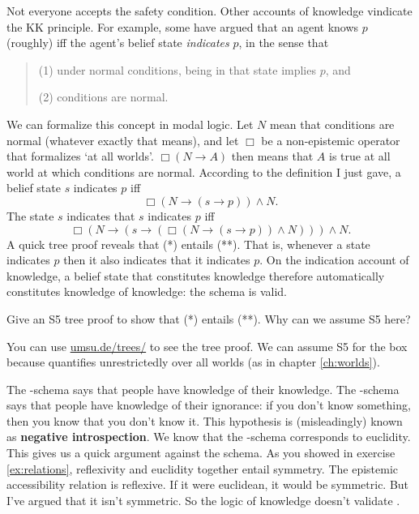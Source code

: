 Not everyone accepts the safety condition. Other accounts of knowledge vindicate
the KK principle. For example, some have argued that an agent knows $p$
(roughly) iff the agent's belief state \emph{indicates} $p$, in the sense that
%
\begin{quote}
\begin{enumerate*}
\item[(1)] under normal conditions, being in that state implies $p$, and
\item[(2)] conditions are normal.
\end{enumerate*}
\end{quote}
% 
We can formalize this concept in modal logic. Let $N$ mean that conditions are
normal (whatever exactly that means), and let $\Box$ be a non-epistemic operator
that formalizes `at all worlds'. $\Box(N \to A)$ then means that $A$ is true at
all world at which conditions are normal. According to the definition I just
gave, a belief state $s$ indicates $p$ iff
\begin{equation}\tag{*}
  \Box(N \to (s\to p)) \land N.
\end{equation}
The state $s$ indicates that $s$ indicates $p$ iff
\begin{equation}\tag{**}
  \Box(N \to (s \to (\Box(N \to (s \to p)) \land N))) \land N.
\end{equation}
A quick tree proof reveals that (*) entails (**). That is, whenever a state
indicates $p$ then it also indicates that it indicates $p$. On the indication
account of knowledge, a belief state that constitutes knowledge therefore
automatically constitutes knowledge of knowledge: the  schema is valid.

\begin{exercise}
  Give an S5 tree proof to show that (*) entails (**). Why can we
  assume S5 here?
\end{exercise}
\begin{solution}
  You can use
  \href{https://www.umsu.de/trees/}{umsu.de/trees/} to
  see the tree proof. We can assume S5 for the box because quantifies
  unrestrictedly over all worlds (as in chapter \ref{ch:worlds}).
\end{solution}

The -schema says that people have knowledge of their knowledge. The
-schema says that people have knowledge of their ignorance: if you don't
know something, then you know that you don't know it. This hypothesis is
(misleadingly) known as \textbf{negative introspection}.
%
%
We know that the -schema corresponds to euclidity. This gives us a quick
argument against the schema. As you showed in exercise \ref{ex:relations},
reflexivity and euclidity together entail symmetry. The epistemic accessibility
relation is reflexive. If it were euclidean, it would be symmetric. But I've
argued that it isn't symmetric. So the logic of knowledge doesn't validate
.

